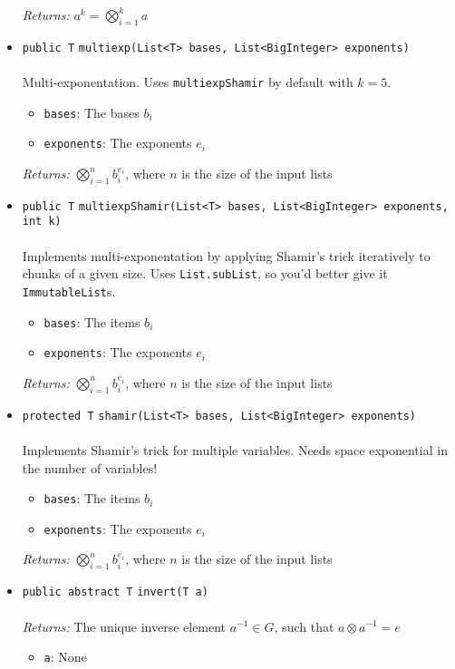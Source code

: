 \begin{itemize}
\emph{Returns:} $a^k = \bigotimes_{i=1}^{k} a$

\item \lstinline|public T| \lstinline|multiexp|\lstinline|(List<T> bases, List<BigInteger> exponents)|\\ \\[-0.6em]
Multi-exponentation. Uses \lstinline|multiexpShamir| by default
 with $k = 5$.
\begin{itemize}
\item \lstinline|bases|: The bases $b_i$
\item \lstinline|exponents|: The exponents $e_i$
\end{itemize}

\emph{Returns:} $\bigotimes_{i=1}^n b_i^{e_i}$, where $n$
         is the size of the input lists

\item \lstinline|public T| \lstinline|multiexpShamir|\lstinline|(List<T> bases, List<BigInteger> exponents, int k)|\\ \\[-0.6em]
Implements multi-exponentation by applying Shamir's trick
 iteratively to chunks of a given size.
 Uses \lstinline|List.subList|, so you'd better give it
 \lstinline|ImmutableList|s.
\begin{itemize}
\item \lstinline|bases|: The items $b_i$
\item \lstinline|exponents|: The exponents $e_i$
\end{itemize}

\emph{Returns:} $\bigotimes_{i=1}^n b_i^{e_i}$, where $n$
         is the size of the input lists

\item \lstinline|protected T| \lstinline|shamir|\lstinline|(List<T> bases, List<BigInteger> exponents)|\\ \\[-0.6em]
Implements Shamir's trick for multiple variables.
 Needs space exponential in the number of variables!
\begin{itemize}
\item \lstinline|bases|: The items $b_i$
\item \lstinline|exponents|: The exponents $e_i$
\end{itemize}

\emph{Returns:} $\bigotimes_{i=1}^n b_i^{e_i}$, where $n$
         is the size of the input lists

\item \lstinline|public abstract T| \lstinline|invert|\lstinline|(T a)|\\ \\[-0.6em]
\emph{Returns:} The unique inverse element $a^{-1} \in G$, such that
         $a \otimes a^{-1} = e$
\begin{itemize}
\item \lstinline|a|: None
\end{itemize}




\end{itemize}
